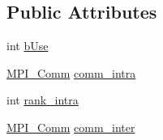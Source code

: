 \subsection*{\-Public \-Attributes}
\begin{DoxyCompactItemize}
\item 
int \hyperlink{structgmx__nodecomm__t_a904fb41e4b451fa76fa0ae65ec53eb85}{b\-Use}
\item 
\hyperlink{include_2thread__mpi_2mpi__bindings_8h_a3880364558bd42f832e48ed33e6fafbb}{\-M\-P\-I\-\_\-\-Comm} \hyperlink{structgmx__nodecomm__t_afae7484f448c0085bf165a1027872a22}{comm\-\_\-intra}
\item 
int \hyperlink{structgmx__nodecomm__t_a63850c544dc8d9faec882058957acb1a}{rank\-\_\-intra}
\item 
\hyperlink{include_2thread__mpi_2mpi__bindings_8h_a3880364558bd42f832e48ed33e6fafbb}{\-M\-P\-I\-\_\-\-Comm} \hyperlink{structgmx__nodecomm__t_a4e6e810d89391b34f11873b2dbb7c33d}{comm\-\_\-inter}
\end{DoxyCompactItemize}


